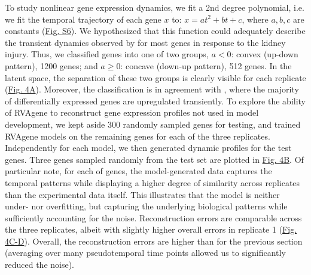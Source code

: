 \par
To study nonlinear gene expression dynamics, we fit a 2nd degree polynomial, i.e. we fit the temporal trajectory of each gene $x$ to:  $x = at^2 + bt + c$, where $a,b,c$ are constants (\hyperref[supp]{Fig. S6}). We hypothesized that this function could adequately describe the transient dynamics observed by \citet{liu2017molecular} for most genes in response to the kidney injury. 
Thus, we classified genes into one of two groups, $a < 0$: convex (up-down pattern), 1200 genes; and $a \geq 0$: concave (down-up pattern), 512 genes. In the latent space, the separation of these two groups is clearly visible for each replicate (\hyperref[fig:fig6a]{Fig. 4A}). Moreover, the classification is in agreement with \citet{liu2017molecular}, where the majority of differentially expressed genes are upregulated transiently. 
To explore the ability of RVAgene to reconstruct gene expression profiles not used in model development, we kept aside 300 randomly sampled genes for testing, and trained RVAgene models on the remaining genes for each of the three replicates. Independently for each model, we then generated dynamic profiles for the test genes. Three genes sampled randomly from the test set are plotted in \hyperref[fig:fig6a]{Fig. 4B}. Of particular note, for each of genes, the model-generated data captures the temporal patterns while displaying a higher degree of similarity across replicates than the experimental data itself. This illustrates that the model is neither under- nor overfitting, but capturing the underlying biological patterns while sufficiently accounting for the noise. 
Reconstruction errors are comparable across the three replicates, albeit with slightly higher overall errors in replicate 1 (\hyperref[fig:fig6a]{Fig. 4C-D}). Overall, the reconstruction errors are higher than for the previous section (averaging over many pseudotemporal time points allowed us to significantly reduced the noise). 



